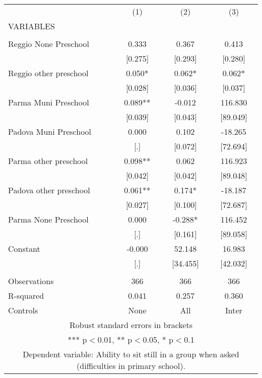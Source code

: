 \begin{tabular}{lccc} \hline
 & (1) & (2) & (3) \\
VARIABLES &  &  &  \\ \hline
 &  &  &  \\
Reggio None Preschool & 0.333 & 0.367 & 0.413 \\
 & [0.275] & [0.293] & [0.280] \\
Reggio other preschool & 0.050* & 0.062* & 0.062* \\
 & [0.028] & [0.036] & [0.037] \\
Parma Muni Preschool & 0.089** & -0.012 & 116.830 \\
 & [0.039] & [0.043] & [89.049] \\
Padova Muni Preschool & 0.000 & 0.102 & -18.265 \\
 & [.] & [0.072] & [72.694] \\
Parma other preschool & 0.098** & 0.062 & 116.923 \\
 & [0.042] & [0.042] & [89.048] \\
Padova other preschool & 0.061** & 0.174* & -18.187 \\
 & [0.027] & [0.100] & [72.687] \\
Parma None Preschool & 0.000 & -0.288* & 116.452 \\
 & [.] & [0.161] & [89.058] \\
Constant & -0.000 & 52.148 & 16.983 \\
 & [.] & [34.455] & [42.032] \\
 &  &  &  \\
Observations & 366 & 366 & 366 \\
R-squared & 0.041 & 0.257 & 0.360 \\
 Controls & None & All & Inter \\ \hline
\multicolumn{4}{c}{ Robust standard errors in brackets} \\
\multicolumn{4}{c}{ *** p$<$0.01, ** p$<$0.05, * p$<$0.1} \\
\multicolumn{4}{c}{ Dependent variable: Ability to sit still in a group when asked (difficulties in primary school).} \\
\end{tabular}
